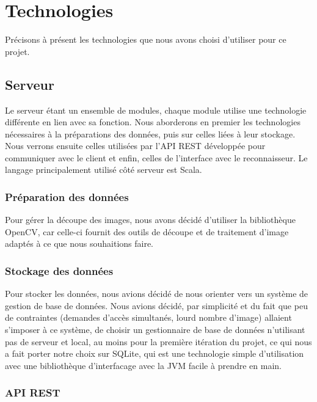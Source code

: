 \section{Technologies}

Précisons à présent les technologies que nous avons choisi d'utiliser pour ce projet.

\subsection{Serveur}

Le serveur étant un ensemble de modules, chaque module utilise une technologie différente en lien avec sa fonction. Nous aborderons en premier les technologies nécessaires à la préparations des données, puis sur celles liées à leur stockage. Nous verrons ensuite celles utilisées par l'API REST développée pour communiquer avec le client et enfin, celles de l'interface avec le reconnaisseur. Le langage principalement utilisé côté serveur est Scala.

\subsubsection{Préparation des données}

Pour gérer la découpe des images, nous avons décidé d'utiliser la bibliothèque OpenCV, car celle-ci fournit des outils de découpe et de traitement d'image adaptés à ce que nous souhaitions faire.

\subsubsection{Stockage des données}

Pour stocker les données, nous avions décidé de nous orienter vers un système de gestion de base de données. Nous avions décidé, par simplicité et du fait que peu de contraintes (demandes d'accès simultanés, lourd nombre d'image) allaient s'imposer à ce système, de choisir un gestionnaire de base de données n'utilisant pas de serveur et local, au moins pour la première itération du projet, ce qui nous a fait porter notre choix sur SQLite, qui est une technologie simple d'utilisation avec une bibliothèque d'interfacage avec la JVM facile à prendre en main.

\subsubsection{API REST}

